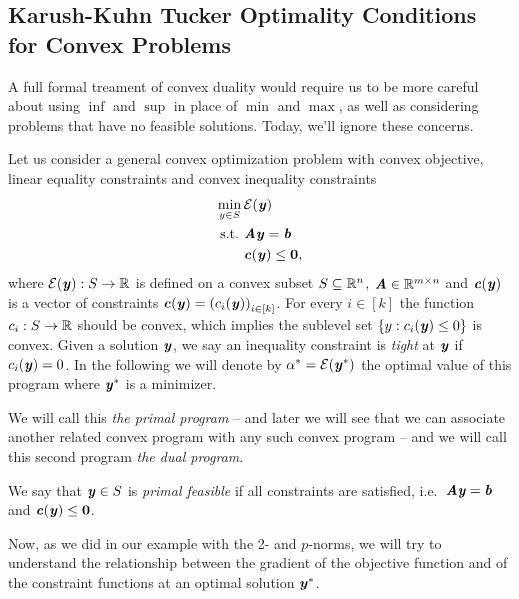 {\subsection{Karush-Kuhn Tucker Optimality Conditions for Convex Problems}

A full formal treament of convex duality would require us to be more careful
about using $\inf$ and $\sup$ in place of $\min$ and $\max$, as well
as considering problems that have no feasible solutions.
Today, we'll ignore these concerns.

Let us consider a general convex optimization problem with convex objective, linear equality constraints and convex inequality constraints
\begin{align}
  \label{eq:primalprob}
     \min_{y \in S}{} & \mathcal{E}(\boldsymbol{\mathit{y}}) \\ \nonumber
\text{s.t.}\  & \boldsymbol{\mathit{A}}\boldsymbol{\mathit{y}} = \boldsymbol{\mathit{b}} \\ \nonumber
              & \boldsymbol{\mathit{c}}(\boldsymbol{\mathit{y}}) \leq \boldsymbol{0},
\end{align}
where $\mathcal{E}(\boldsymbol{\mathit{y}}): S \rightarrow \mathbb{R}$ is defined on a convex subset $S \subseteq \mathbb{R}^n$, $\boldsymbol{\mathit{A}} \in \mathbb{R}^{m\times n}$
and $\boldsymbol{\mathit{c}}(\boldsymbol{\mathit{y}})$ is a vector of constraints $\boldsymbol{\mathit{c}}(\boldsymbol{\mathit{y}}) = \left(c_i(\boldsymbol{\mathit{y}})\right)_{i \in [k]}$.
For every $i \in [k]$ the function $c_i: S \rightarrow \mathbb{R}$ should be convex,
which implies the sublevel set $\left\{y : c_i(\boldsymbol{\mathit{y}}) \leq 0  \right\}$ is
convex.
Given a solution $\boldsymbol{\mathit{y}}$, we say an inequality constraint is
\emph{tight} at $\boldsymbol{\mathit{y}}$ if $c_i(\boldsymbol{\mathit{y}}) = 0$.
In the following we will denote by $\alpha^* = \mathcal{E}(\boldsymbol{\mathit{y}}^*)$ the optimal value of this program where $\boldsymbol{\mathit{y}}^*$ is a minimizer.

We will call this \emph{the primal program} -- and later we will see
that we can associate another related convex program with any such
convex program -- and we will call this second program \emph{the dual program}.

\begin{definition}
We say that $\boldsymbol{\mathit{y}} \in S$ is \emph{primal feasible} if all constraints are satisfied, i.e.~$\boldsymbol{\mathit{A}}\boldsymbol{\mathit{y}} = \boldsymbol{\mathit{b}}$ and $\boldsymbol{\mathit{c}}(\boldsymbol{\mathit{y}}) \leq \boldsymbol{0}$.
\end{definition}

Now, as we did in our example with the 2- and $p$-norms, we will try
to understand the relationship between the gradient of the objective
function and of the constraint functions at an optimal solution $\boldsymbol{\mathit{y}}^*$.

}
